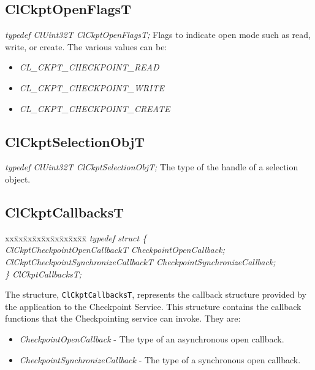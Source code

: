 \begin{flushleft}
\subsection{ClCkptOpenFlagsT}
\textit{typedef ClUint32T ClCkptOpenFlagsT;}
\newline
\newline
Flags to indicate open mode such as read, write, or create. The various values can be:
\begin{itemize}
\item
\textit{CL\_\-CKPT\_\-CHECKPOINT\_\-READ}
\item
\textit{CL\_\-CKPT\_\-CHECKPOINT\_\-WRITE}
\item
\textit{CL\_\-CKPT\_\-CHECKPOINT\_\-CREATE}
\end{itemize}


\subsection{ClCkptSelectionObjT}
\textit{typedef ClUint32T  ClCkptSelectionObjT;}
\newline
\newline
The type of the handle of a selection object.


\subsection{ClCkptCallbacksT}
\begin{tabbing}
xx\=xx\=xx\=xx\=xx\=xx\=xx\=xx\=xx\=\kill
\textit{typedef struct \{}\\
\>\>\>\>\textit{ClCkptCheckpointOpenCallbackT CheckpointOpenCallback;}\\
\>\>\>\>\textit{ClCkptCheckpointSynchronizeCallbackT CheckpointSynchronizeCallback;}\\
\textit{\} ClCkptCallbacksT;}\end{tabbing}
The structure, {\tt{ClCkptCallbacksT}}, represents the callback structure provided by the application to the Checkpoint Service. This structure  
contains the callback functions that the Checkpointing service can invoke. They are:
\begin{itemize}
\item
\textit{CheckpointOpenCallback} - The type of an asynchronous open callback.
\item
\textit{CheckpointSynchronizeCallback} - The type of a synchronous open callback.
\end{itemize}




\end{flushleft}
